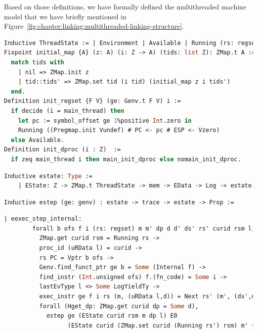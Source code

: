 Based on those definitions, we have formally defined 
the multithreaded machine model that we have briefly 
mentioned in Figure~\ref{fig:chapter:linking:multithreaded-linking-structure}.
\begin{lstlisting}[language=Caml]
Inductive ThreadState := | Environment | Available | Running (rs: regset).
Fixpoint initial_map {A} (z: A) (i: Z -> A) (tids: list Z): ZMap.t A :=
  match tids with
    | nil => ZMap.init z
    | tid::tids' => ZMap.set tid (i tid) (initial_map z i tids')
  end.
Definition init_regset {F V} (ge: Genv.t F V) i :=
  if decide (i = main_thread) then
    let pc := symbol_offset ge 1%positive Int.zero in
    Running ((Pregmap.init Vundef) # PC <- pc # ESP <- Vzero)
  else Available.
Definition init_dproc (i : Z)  :=
  if zeq main_thread i then main_init_dproc else nomain_init_dproc.
\end{lstlisting}



\begin{lstlisting}[language=Caml]
  Inductive estate: Type :=
    | EState: Z -> ZMap.t ThreadState -> mem -> EData -> Log -> estate.
\end{lstlisting}


\begin{lstlisting}[language=Caml]
  Inductive estep (ge: genv) : estate -> trace -> estate -> Prop :=
\end{lstlisting}


\begin{lstlisting}[language=Caml]
    | eexec_step_internal:
        forall b ofs f i (rs: regset) m m' dp d d' ds' rs' curid rsm l,
          ZMap.get curid rsm = Running rs ->
          proc_id (uRData l) = curid ->
          rs PC = Vptr b ofs ->
          Genv.find_funct_ptr ge b = Some (Internal f) ->
          find_instr (Int.unsigned ofs) f.(fn_code) = Some i ->
          lastEvType l <> Some LogYieldTy ->
          exec_instr ge f i rs (m, (uRData l,d)) = Next rs' (m', (ds',d')) ->
          forall (Hget_dp: ZMap.get curid dp = Some d),
            estep ge (EState curid rsm m dp l) E0
                  (EState curid (ZMap.set curid (Running rs') rsm) m' (ZMap.set curid (Some d') dp) l)
\end{lstlisting}


